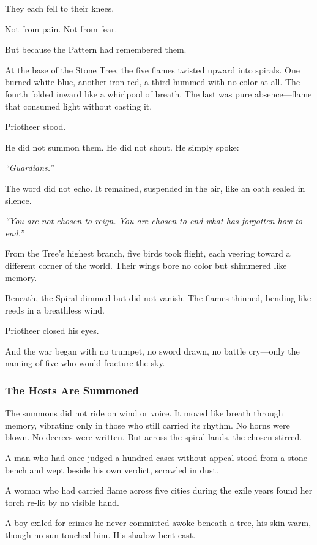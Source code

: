 \documentclass[12pt]{article}
\begin{document}
They each fell to their knees.

Not from pain. Not from fear.

But because the Pattern had remembered them.

At the base of the Stone Tree, the five flames twisted upward into spirals. One burned white-blue, another iron-red, a third hummed with no color at all. The fourth folded inward like a whirlpool of breath. The last was pure absence—flame that consumed light without casting it.

Priotheer stood.

He did not summon them. He did not shout. He simply spoke:

\emph{``Guardians.''}

The word did not echo. It remained, suspended in the air, like an oath sealed in silence.

\emph{``You are not chosen to reign. You are chosen to end what has forgotten how to end.''}

From the Tree’s highest branch, five birds took flight, each veering toward a different corner of the world. Their wings bore no color but shimmered like memory.

Beneath, the Spiral dimmed but did not vanish. The flames thinned, bending like reeds in a breathless wind.

Priotheer closed his eyes.

And the war began with no trumpet, no sword drawn, no battle cry—only the naming of five who would fracture the sky.


\dotfill

\subsubsection*{The Hosts Are Summoned}

The summons did not ride on wind or voice. It moved like breath through memory, vibrating only in those who still carried its rhythm. No horns were blown. No decrees were written. But across the spiral lands, the chosen stirred.

A man who had once judged a hundred cases without appeal stood from a stone bench and wept beside his own verdict, scrawled in dust.

A woman who had carried flame across five cities during the exile years found her torch re-lit by no visible hand.

A boy exiled for crimes he never committed awoke beneath a tree, his skin warm, though no sun touched him. His shadow bent east.
\end{document}
